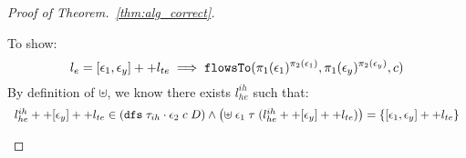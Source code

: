 \begin{proof}[Proof of Theorem.~\ref{thm:alg_correct}]
\begin{case}
\begin{subcase}
\begin{subsubcase}
To show:
\[  
  l_e = [\mathtt{\epsilon}_1, \mathtt{\epsilon}_y] ++ l_{te}
  \implies
\mathtt{flowsTo}(\pi_1(\mathtt{\epsilon}_1)^{\pi_2(\mathtt{\epsilon}_1)}, \pi_1(\mathtt{\epsilon}_y)^{\pi_2(\mathtt{\epsilon}_y)}, c)
\]
By definition of $\uplus$, we know there exists $l^{ih}_{he}$ such that:
\[
\begin{array}{l}
  l^{ih}_{he} ++ [\event_y] ++ l_{te} \in (\kw{dfs} \eapp {\trace_{ih} \cdot \event_2} \eapp c \eapp D )
  \land
  \left(\uplus \eapp \event_1 \eapp \trace \eapp ( l^{ih}_{he} ++ [\event_y] ++ l_{te}) \right) 
  = \{[\event_1, \event_y] ++ l_{te}\}
\end{array}
\]
%

\end{subsubcase}
\end{subcase}
\end{case}
\end{proof}
